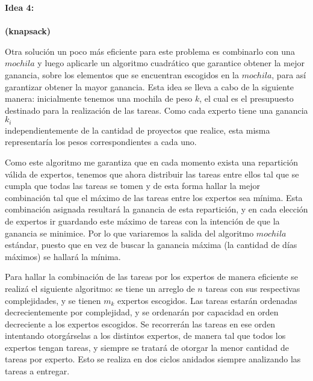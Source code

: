 \documentclass[10pt,letterpaper]{article}
\begin{document}
{ 	
 	{\Large \bf Idea 4:}\\ \\
 	{\small \bf (knapsack)}
 	
 	Otra soluci\'on un poco m\'as eficiente para este problema es combinarlo con una $mochila$ y luego aplicarle un algoritmo cuadr\'atico que garantice obtener la mejor ganancia, sobre los elementos que se encuentran escogidos en la $mochila$, para as\'i garantizar obtener la mayor ganancia. Esta idea se lleva a cabo de la siguiente manera: inicialmente tenemos una mochila de peso $k$, el cual es el presupuesto destinado para la realizaci\'on de las tareas.  Como cada experto tiene una ganancia $k_i$ \\ independientemente de la cantidad de proyectos que realice, esta misma representar\'ia los pesos correspondientes a cada uno. 
 	
 	Como este algoritmo me garantiza que en cada momento exista una repartici\'on v\'alida de expertos, tenemos que ahora distribuir las tareas entre ellos tal que se cumpla que todas las tareas se tomen y de esta forma hallar la mejor combinaci\'on tal que el m\'aximo de las tareas entre los expertos sea m\'inima. Esta combinaci\'on asignada resultar\'a la ganancia de esta repartici\'on, y en cada elecci\'on de expertos ir guardando este m\'aximo de tareas con la intenci\'on de que la ganancia se minimice. Por lo que variaremos la salida del algoritmo $mochila$ est\'andar, puesto que en vez de buscar la ganancia m\'axima (la cantidad de d\'ias m\'aximos) se hallar\'a la m\'inima. 
 	
 	Para hallar la combinaci\'on de las tareas por los expertos de manera eficiente se realiz\'a el siguiente algoritmo: se tiene un arreglo de $n$ tareas con sus respectivas complejidades, y se tienen $m_k$ expertos escogidos. Las tareas estar\'an ordenadas decrecientemente por complejidad, y se ordenar\'an por capacidad en orden decreciente a los expertos escogidos. Se recorrer\'an las tareas en ese orden intentando otorg\'arselas a los distintos expertos, de manera tal que todos los expertos tengan tareas, y siempre se tratar\'a de otorgar la menor cantidad de tareas por experto. Esto se realiza en dos ciclos anidados siempre analizando las tareas a entregar. \\ \\
 	
 }
 	
 
\end{document}
